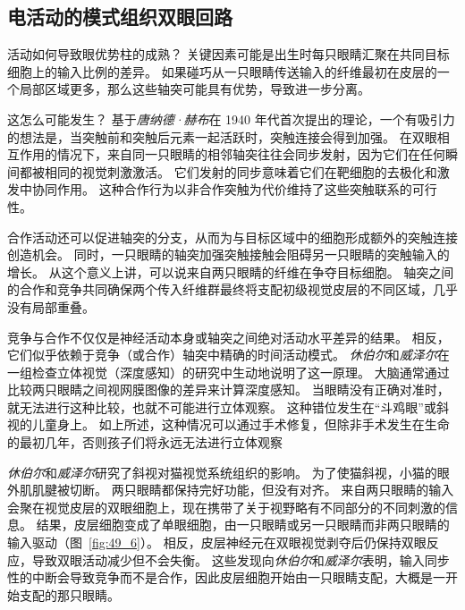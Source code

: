 \subsection{电活动的模式组织双眼回路}

活动如何导致眼优势柱的成熟？
关键因素可能是出生时每只眼睛汇聚在共同目标细胞上的输入比例的差异。
如果碰巧从一只眼睛传送输入的纤维最初在皮层的一个局部区域更多，那么这些轴突可能具有优势，导致进一步分离。


这怎么可能发生？
基于\textit{唐纳德·赫布}在 1940 年代首次提出的理论，一个有吸引力的想法是，当突触前和突触后元素一起活跃时，突触连接会得到加强。
在双眼相互作用的情况下，来自同一只眼睛的相邻轴突往往会同步发射，因为它们在任何瞬间都被相同的视觉刺激激活。
它们发射的同步意味着它们在靶细胞的去极化和激发中协同作用。
这种合作行为以非合作突触为代价维持了这些突触联系的可行性。


合作活动还可以促进轴突的分支，从而为与目标区域中的细胞形成额外的突触连接创造机会。
同时，一只眼睛的轴突加强突触接触会阻碍另一只眼睛的突触输入的增长。
从这个意义上讲，可以说来自两只眼睛的纤维在争夺目标细胞。
轴突之间的合作和竞争共同确保两个传入纤维群最终将支配初级视觉皮层的不同区域，几乎没有局部重叠。


竞争与合作不仅仅是神经活动本身或轴突之间绝对活动水平差异的结果。
相反，它们似乎依赖于竞争（或合作）轴突中精确的时间活动模式。
\textit{休伯尔}和\textit{威泽尔}在一组检查立体视觉（深度感知）的研究中生动地说明了这一原理。
大脑通常通过比较两只眼睛之间视网膜图像的差异来计算深度感知。
当眼睛没有正确对准时，就无法进行这种比较，也就不可能进行立体观察。
这种错位发生在“斗鸡眼”或斜视的儿童身上。
如上所述，这种情况可以通过手术修复，但除非手术发生在生命的最初几年，否则孩子们将永远无法进行立体观察


\textit{休伯尔}和\textit{威泽尔}研究了斜视对猫视觉系统组织的影响。
为了使猫斜视，小猫的眼外肌肌腱被切断。 两只眼睛都保持完好功能，但没有对齐。
来自两只眼睛的输入会聚在视觉皮层的双眼细胞上，现在携带了关于视野略有不同部分的不同刺激的信息。
结果，皮层细胞变成了单眼细胞，由一只眼睛或另一只眼睛而非两只眼睛的输入驱动（图~\ref{fig:49_6}）。 
相反，皮层神经元在双眼视觉剥夺后仍保持双眼反应，导致双眼活动减少但不会失衡。
这些发现向\textit{休伯尔}和\textit{威泽尔}表明，输入同步性的中断会导致竞争而不是合作，因此皮层细胞开始由一只眼睛支配，大概是一开始支配的那只眼睛。



